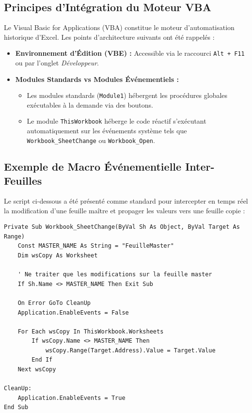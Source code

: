\documentclass[12pt,a4paper]{article}
\begin{document}
\subsection{Principes d'Intégration du Moteur VBA}
Le Visual Basic for Applications (VBA) constitue le moteur d’automatisation historique d’Excel. Les points d'architecture suivants ont été rappelés :
\begin{itemize}
    \item \textbf{Environnement d'Édition (VBE) :} Accessible via le raccourci \texttt{Alt + F11} ou par l'onglet \textit{Développeur}.
    \item \textbf{Modules Standards vs Modules Événementiels :} 
    \begin{itemize}
        \item Les modules standards (\texttt{Module1}) hébergent les procédures globales exécutables à la demande via des boutons.
        \item Le module \texttt{ThisWorkbook} héberge le code réactif s'exécutant automatiquement sur les événements système tels que \texttt{Workbook\_SheetChange} ou \texttt{Workbook\_Open}.
    \end{itemize}
\end{itemize}

\subsection{Exemple de Macro Événementielle Inter-Feuilles}
Le script ci-dessous a été présenté comme standard pour intercepter en temps réel la modification d'une feuille maître et propager les valeurs vers une feuille copie :

\begin{lstlisting}[caption=Macro événementielle de synchronisation inter-feuilles]
Private Sub Workbook_SheetChange(ByVal Sh As Object, ByVal Target As Range)
    Const MASTER_NAME As String = "FeuilleMaster"
    Dim wsCopy As Worksheet
    
    ' Ne traiter que les modifications sur la feuille master
    If Sh.Name <> MASTER_NAME Then Exit Sub
    
    On Error GoTo CleanUp
    Application.EnableEvents = False
    
    For Each wsCopy In ThisWorkbook.Worksheets
        If wsCopy.Name <> MASTER_NAME Then
            wsCopy.Range(Target.Address).Value = Target.Value
        End If
    Next wsCopy

CleanUp:
    Application.EnableEvents = True
End Sub
\end{lstlisting}
\end{document}
